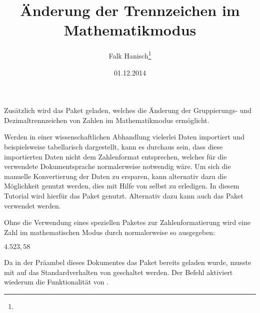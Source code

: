 \documentclass[english,ngerman]{tudscrartcl}
\begin{document}
\title{Änderung der Trennzeichen im Mathematikmodus}
\author{Falk Hanisch\thanks{\noexpand\scriptsize\noexpand\Email{\tudscrmail}}}
\date{01.12.2014}
\makeatletter
\begingroup%
  \def\and{, }%
  \let\thanks\@gobble%
  \let\footnote\@gobble%
\endgroup%
\markright{\@title}
\makeatother
\StartTutorial
%
%
Zusätzlich wird das Paket  geladen, welches die Änderung der 
Gruppierungs- und Dezimaltrennzeichen von Zahlen im Mathematikmodus ermöglicht.
%
\begin{Preamble}
\usepackage{mathswap}
\end{Preamble}
%
Werden in einer wissenschaftlichen Abhandlung vielerlei Daten importiert und 
beispielsweise tabellarisch dargestellt, kann es durchaus sein, dass diese 
importierten Daten nicht dem Zahlenformat entsprechen, welches für die 
verwendete Dokumentsprache normalerweise notwendig wäre. Um sich die manuelle 
Konvertierung der Daten zu ersparen, kann alternativ dazu die Möglichkeit 
genutzt werden, dies mit Hilfe von  selbst zu erledigen. In 
diesem Tutorial wird hierfür das Paket  genutzt. Alternativ 
dazu kann auch das Paket  verwendet werden.

Ohne die Verwendung eines speziellen Paketes zur Zahlenformatierung wird eine 
Zahl im mathematischen Modus durch  normalerweise so 
ausgegeben: 
%
\begin{Trunk*}
\mathswapoff
\(4.523,58\)
\mathswapon
\end{Trunk*}
%
Da in der Präambel dieses Dokumentes das Paket  bereits 
geladen wurde, musste mit  auf das Standardverhalten von 
 geschaltet werden. Der Befehl  aktiviert 
wiederum die Funktionalität von .
\end{document}

